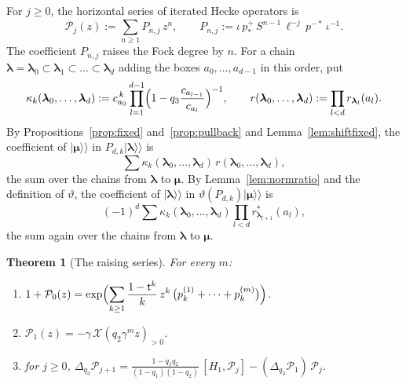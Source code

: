 \documentclass[11pt]{amsart}
\newtheorem{theorem}{Theorem}[section]
\theoremstyle{definition}
\theoremstyle{remark}
\newcommand{\Mt}{\mathsf t}                      %
\newcommand{\bl}{{\boldsymbol{\lambda}}}         %
\newcommand{\bmu}{{\boldsymbol{\mu}}}
\newcommand{\res}[2]{r_{#1}(#2)}                 %
\newcommand{\cores}[2]{r^*_{#1}(#2)}             %
\newcommand{\Cartan}[1]{H_{#1}}                  %
\newcommand{\ceig}[1]{c_{#1}}                    %
\newcommand{\kket}[1]{\lvert #1\rangle\!\rangle} %
\newcommand{\taut}{\ell}                         %
\newcommand{\pulm}{p^{-*}}                       %
\newcommand{\pushp}{p^+_*}                       %
\newcommand{\Shift}{S}                           %
\newcommand{\pk}[2]{p_{#1}^{(#2)}}               %
\newcommand{\Hiso}{\iota}                        %
\newcommand{\Pser}[1]{\mathcal P_{#1}}           %
\newcommand{\Dq}{\Delta_{q_3}}                   %
\newcommand{\Xcur}{\mathcal X}                   %
\begin{document}
For \(j\geq0\), the horizontal series of iterated Hecke operators is
\[
 \Pser{j}(z):=\sum_{n\geq1}P_{n,j}\,z^n,\qquad
 P_{n,j}:=\Hiso\,\pushp\,\Shift^{n-1}\,\taut^{-j}\,\pulm\,\Hiso^{-1}.
\]
The coefficient \(P_{n,j}\) raises the Fock degree by \(n\).
For a chain \(\bl=\bl_0\subset\bl_1\subset\dots\subset\bl_d\) adding the boxes
\(a_0,\dots,a_{d-1}\) in this order, put
\[
 \kappa_k(\bl_0,\dots,\bl_d):=\ceig{a_0}^{\,k}\prod_{l=1}^{d-1}
 \Bigl(1-q_3\frac{\ceig{a_{l-1}}}{\ceig{a_l}}\Bigr)^{-1},\qquad
 r(\bl_0,\dots,\bl_d):=\prod_{l<d}\res{\bl_l}{a_l}.
\]
By Propositions~\ref{prop:fixed} and~\ref{prop:pullback} and Lemma~\ref{lem:shiftfixed}, the coefficient of
\(\kket{\bmu}\) in \(P_{d,k}\kket{\bl}\) is
\begin{equation}\label{eq:Pchains}
 \sum\kappa_k(\bl_0,\dots,\bl_d)\,r(\bl_0,\dots,\bl_d),
\end{equation}
the sum over the chains from \(\bl\) to \(\bmu\). By Lemma~\ref{lem:normratio} and the definition of
\(\vartheta\), the coefficient of \(\kket{\bl}\) in \(\vartheta(P_{d,k})\kket{\bmu}\) is
\begin{equation}\label{eq:Pvartheta}
 (-1)^d\sum\kappa_k(\bl_0,\dots,\bl_d)\prod_{l<d}\cores{\bl_{l+1}}{a_l},
\end{equation}
the sum again over the chains from \(\bl\) to \(\bmu\).

\begin{samepage}
\begin{theorem}[The raising series]\label{thm:raising}
For every \(m\):
\begin{enumerate}
\item[(i)] \(\displaystyle 1+\Pser{0}(z)=\exp\Bigl(\sum_{k\geq1}\frac{1-\Mt^k}{k}\,z^k\,
\bigl(\pk{k}{1}+\dots+\pk{k}{m}\bigr)\Bigr)\).
\item[(ii)] \(\Pser{1}(z)=-\gamma\,\Xcur(q_2\gamma^mz)_{>0}\).
\item[(iii)] for \(j\geq0\),
\(\displaystyle\Dq\Pser{j+1}=\frac{1-q_1q_2}{(1-q_1)(1-q_2)}\,[\Cartan{1},\Pser{j}]
-(\Dq\Pser{1})\,\Pser{j}\).
\end{enumerate}
\end{theorem}
\end{samepage}
\end{document}
